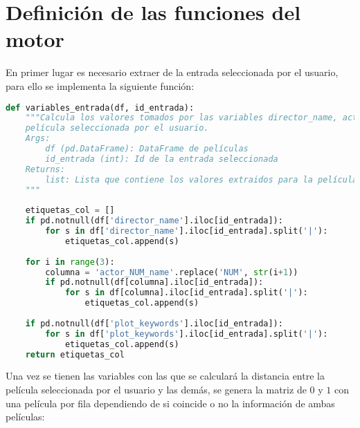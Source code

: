 \section{Definición de las funciones del motor}

En primer lugar es necesario extraer de la entrada seleccionada por el usuario, para ello se implementa la siguiente función:
\begin{lstlisting}[language=Python, caption= {Variables utilizadas para la creación de la matriz de coordenadas. Toma los valores de las variables director y actores principales así como de las keywords y devuelve una lista con las coordenadas extraidas para la fila dada.}, label= {lst:variablesfila}]
def variables_entrada(df, id_entrada): 
    """Calcula los valores tomados por las variables director_name, actor_[1,2,3]_name y plot_keywords para la
    película seleccionada por el usuario.
    Args:
        df (pd.DataFrame): DataFrame de películas
        id_entrada (int): Id de la entrada seleccionada
    Returns:
        list: Lista que contiene los valores extraidos para la película seleccionada
    """
    
    etiquetas_col = []    
    if pd.notnull(df['director_name'].iloc[id_entrada]):
        for s in df['director_name'].iloc[id_entrada].split('|'):
            etiquetas_col.append(s)
            
    for i in range(3):
        columna = 'actor_NUM_name'.replace('NUM', str(i+1))
        if pd.notnull(df[columna].iloc[id_entrada]):
            for s in df[columna].iloc[id_entrada].split('|'):
                etiquetas_col.append(s)
                
    if pd.notnull(df['plot_keywords'].iloc[id_entrada]):
        for s in df['plot_keywords'].iloc[id_entrada].split('|'):
            etiquetas_col.append(s)
    return etiquetas_col
\end{lstlisting}

Una vez se tienen las variables con las que se calculará la distancia entre la película seleccionada por el usuario y las demás, se genera la matriz de $0$ y $1$ con una película por fila dependiendo de si coincide o no la información de ambas películas:

